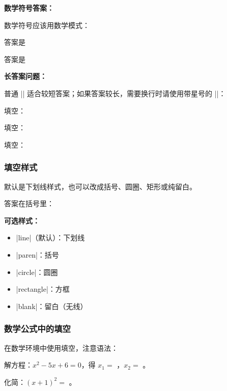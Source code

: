 \textbf{数学符号答案：}

数学符号应该用数学模式：

\begin{latexcode}
  答案是 \fillin[x^2 + 1]

  答案是 \fillin[$x^2 + 1$]
\end{latexcode}

\textbf{长答案问题：}

普通 |\fillin| 适合较短答案；如果答案较长，需要换行时请使用带星号的 |\fillin*|：

\begin{latexcode}
  填空：\fillin[3.14]

  填空：

  填空：\fillin[width = 8em][长答案]
\end{latexcode}

\subsubsection{填空样式}

默认是下划线样式，也可以改成括号、圆圈、矩形或纯留白。

\begin{latexcode}

  答案在括号里：\fillin[答案]
\end{latexcode}

\textbf{可选样式：}
\begin{itemize}
  \item |line|（默认）：下划线 \fillin[答案]
  \item |paren|：括号 \fillin[type=paren][答案]
  \item |circle|：圆圈 \fillin[type=circle][答案]
  \item |rectangle|：方框 \fillin[type=rectangle][答案]
  \item |blank|：留白（无线）
\end{itemize}

\subsubsection{数学公式中的填空}

在数学环境中使用填空，注意语法：

\begin{latexcode}
  \begin{question}
    解方程：$x^2 - 5x + 6 = 0$，得 $x_1 = $ \fillin[2]，$x_2 = $ \fillin[3]。
  \end{question}

  \begin{question}
    化简：$(x + 1)^2 = $ \fillin[$x^2 + 2x + 1$]。
  \end{question}
\end{latexcode}

